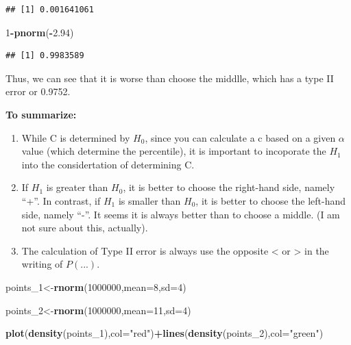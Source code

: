 \documentclass[]{book}
\newenvironment{Shaded}{\begin{snugshade}}{\end{snugshade}}
\newcommand{\DataTypeTok}[1]{\textcolor[rgb]{0.13,0.29,0.53}{#1}}
\newcommand{\DecValTok}[1]{\textcolor[rgb]{0.00,0.00,0.81}{#1}}
\newcommand{\FloatTok}[1]{\textcolor[rgb]{0.00,0.00,0.81}{#1}}
\newcommand{\KeywordTok}[1]{\textcolor[rgb]{0.13,0.29,0.53}{\textbf{#1}}}
\newcommand{\NormalTok}[1]{#1}
\newcommand{\OperatorTok}[1]{\textcolor[rgb]{0.81,0.36,0.00}{\textbf{#1}}}
\newcommand{\StringTok}[1]{\textcolor[rgb]{0.31,0.60,0.02}{#1}}
\begin{document}
\begin{verbatim}
## [1] 0.001641061
\end{verbatim}

\begin{Shaded}
\begin{Highlighting}[]
\DecValTok{1}\OperatorTok{-}\KeywordTok{pnorm}\NormalTok{(}\OperatorTok{-}\FloatTok{2.94}\NormalTok{)}
\end{Highlighting}
\end{Shaded}

\begin{verbatim}
## [1] 0.9983589
\end{verbatim}

Thus, we can see that it is worse than choose the middlle, which has a type II error or 0.9752.

\textbf{To summarize:}

\begin{enumerate}
\def\labelenumi{(\arabic{enumi})}
\item
  While C is determined by \(H_0\), since you can calculate a c based on a given \(\alpha\) value (which determine the percentile), it is important to incoporate the \(H_1\) into the considertation of determining C.
\item
  If \(H_1\) is greater than \(H_0\), it is better to choose the right-hand side, namely ``+''. In contrast, if \(H_1\) is smaller than \(H_0\), it is better to choose the left-hand side, namely ``-''. It seems it is always better than to choose a middle. (I am not sure about this, actually).
\item
  The calculation of Type II error is always use the opposite \textless{} or \textgreater{} in the writing of \(P(...)\).
\end{enumerate}

\begin{Shaded}
\begin{Highlighting}[]
\NormalTok{points_}\DecValTok{1}\NormalTok{<-}\KeywordTok{rnorm}\NormalTok{(}\DecValTok{1000000}\NormalTok{,}\DataTypeTok{mean=}\DecValTok{8}\NormalTok{,}\DataTypeTok{sd=}\DecValTok{4}\NormalTok{)}

\NormalTok{points_}\DecValTok{2}\NormalTok{<-}\KeywordTok{rnorm}\NormalTok{(}\DecValTok{1000000}\NormalTok{,}\DataTypeTok{mean=}\DecValTok{11}\NormalTok{,}\DataTypeTok{sd=}\DecValTok{4}\NormalTok{)}

\KeywordTok{plot}\NormalTok{(}\KeywordTok{density}\NormalTok{(points_}\DecValTok{1}\NormalTok{),}\DataTypeTok{col=}\StringTok{"red"}\NormalTok{)}\OperatorTok{+}\KeywordTok{lines}\NormalTok{(}\KeywordTok{density}\NormalTok{(points_}\DecValTok{2}\NormalTok{),}\DataTypeTok{col=}\StringTok{"green"}\NormalTok{)}
\end{Highlighting}
\end{Shaded}
\end{document}
